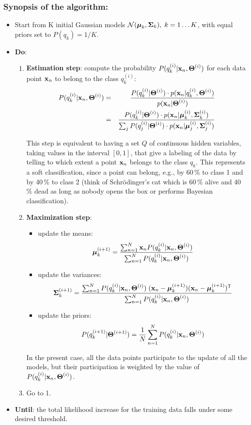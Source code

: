 \documentclass[a4paper]{article}
\newcommand{\trn}{^{\mathsf T}} %
\newcommand{\xv}{\ensuremath\mathbf{x}}  %
\newcommand{\muv}{\ensuremath\boldsymbol{\mu}}  %
\newcommand{\Sm}{\ensuremath\boldsymbol{\Sigma}}  %
\newcommand{\Tm}{\ensuremath\boldsymbol{\Theta}}  %
\begin{document}
\subsubsection*{Synopsis of the algorithm:}
\begin{itemize}
\item Start from K initial Gaussian models ${\cal N}(\muv_{k},\Sm_{k}),
  \; k=1\ldots K$, with equal priors set to $P(q_k) = 1/K$.
\item {\bf Do}:
\begin{enumerate}
\item {\bf Estimation step}: compute the probability
  $P(q_k^{(i)}|\xv_n,\Tm^{(i)})$ for each data point $\xv_n$ to belong
  to the class $q_k^{(i)}$:
%
\begin{eqnarray*}
  P(q_k^{(i)}|\xv_n,\Tm^{(i)}) & = & \frac{P(q_k^{(i)}|\Tm^{(i)})
    \cdot p(\xv_n|q_k^{(i)},\Tm^{(i)})}
  {p(\xv_n|\Tm^{(i)})} \\
  & = & \frac{P(q_k^{(i)}|\Tm^{(i)}) \cdot p(\xv_n|\muv_k^{(i)},\Sm_k^{(i)}) }
  {\sum_j P(q_j^{(i)}|\Tm^{(i)}) \cdot p(\xv_n|\muv_j^{(i)},\Sm_j^{(i)}) }
\end{eqnarray*}

This step is equivalent to having a set $Q$ of continuous hidden
variables, taking values in the interval $[0,1]$, that give a labeling
of the data by telling to which extent a point $\xv_n$ belongs to the
class $q_k$. This represents a soft classification, since a point can
belong, e.g., by 60\,\% to class 1 and by 40\,\% to class 2 (think of
Schr\"odinger's cat which is 60\,\% alive and 40\,\% dead as long as
nobody opens the box or performs Bayesian classification).
%
\item {\bf Maximization step}:
  \begin{itemize}
  \item update the means:
    \[\muv_{k}^{(i+1)} = \frac{\sum_{n=1}^{N} \xv_n
      P(q_k^{(i)}|\xv_n,\Tm^{(i)})}
    {\sum_{n=1}^{N} P(q_k^{(i)}|\xv_n,\Tm^{(i)})} \]
  \item update the variances:
    \[\Sm_{k}^{(i+1)} = \frac{\sum_{n=1}^{N} P(q_k^{(i)}|\xv_n,\Tm^{(i)})\;
      (\xv_n - \muv_k^{(i+1)})(\xv_n - \muv_k^{(i+1)})\trn }
    {\sum_{n=1}^{N} P(q_k^{(i)}|\xv_n,\Tm^{(i)})} \]
  \item update the priors:
    \[ P(q_k^{(i+1)}|\Tm^{(i+1)}) = \frac{1}{N} \sum_{n=1}^{N}
    P(q_k^{(i)}|\xv_n,\Tm^{(i)}) \]
  \end{itemize}
%
In the present case, all the data points participate to the update of all
the models, but their participation is weighted by the value of
$P(q_k^{(i)}|\xv_n,\Tm^{(i)})$.
\item Go to 1.
\end{enumerate}
\item {\bf Until}: the total likelihood increase for the training data
falls under some desired threshold.
\end{itemize}
\end{document}
